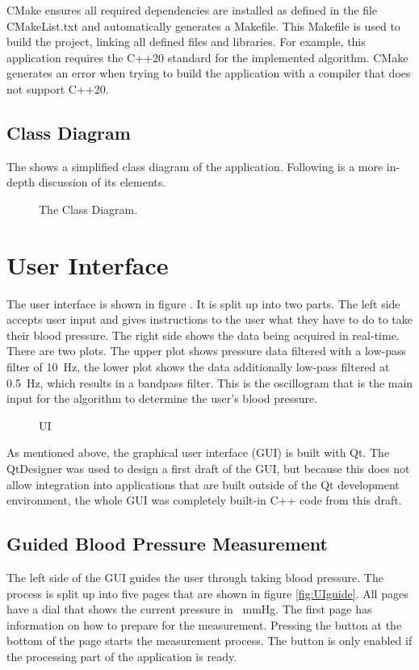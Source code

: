 CMake ensures all required dependencies are installed as defined in the file CMakeList.txt and automatically generates a Makefile. This Makefile is used to build the project, linking all defined files and libraries.
For example, this application requires the C++20 standard for the implemented algorithm. CMake generates an error when trying to build the application with a compiler that does not support C++20.

\subsection{Class Diagram}
The  shows a simplified class diagram of the application. Following is a more in-depth discussion of its elements.

\begin{figure}[ht]
\centering
\caption{The Class Diagram.}
\label{fig:CD}
\end{figure}


\section{User Interface}
The user interface is shown in figure . It is split up into two parts. The left side accepts user input and gives instructions to the user what they have to do to take their blood pressure. The right side shows the data being acquired in real-time. There are two plots. The upper plot shows pressure data filtered with a low-pass filter of \SI{10}{\Hz}, the lower plot shows the data additionally low-pass filtered at \SI{0.5}{\Hz}, which results in a bandpass filter. This is the oscillogram that is the main input for the algorithm to determine the user's blood pressure.

\begin{figure}
\centering
\caption{UI}
\label{fig:UI}
\end{figure}

As mentioned above, the graphical user interface (GUI) is built with Qt.
The QtDesigner was used to design a first draft of the GUI, but because this does not allow integration into applications that are built outside of the Qt development environment, the whole GUI was completely built-in C++ code from this draft.

\subsection{Guided Blood Pressure Measurement}
The left side of the GUI guides the user through taking blood pressure. The process is split up into five pages that are shown in figure \ref{fig:UIguide}.  All pages have a dial that shows the current pressure in \SI{}{\mmHg}. The first page has information on how to prepare for the measurement. Pressing the button at the bottom of the page starts the measurement process. The button is only enabled if the processing part of the application is ready.

